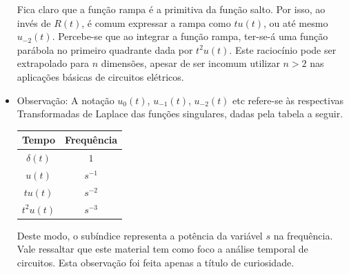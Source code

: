 \documentclass{article}
\numberwithin{equation}{section}
\begin{document}
\begin{itemize}
    Fica claro que a função rampa é a primitiva da função salto. Por isso, ao invés de $R(t)$, é comum expressar a rampa como $tu(t)$, ou até mesmo $u_{-2}(t)$. Percebe-se que ao integrar a função rampa, ter-se-á uma função parábola no primeiro quadrante dada por $t^2u(t)$. Este raciocínio pode ser extrapolado para $n$ dimensões, apesar de ser incomum utilizar $n>2$ nas aplicações básicas de circuitos elétricos.

    \item Observação: A notação $u_0(t)$, $u_{-1}(t)$, $u_{-2}(t)$ etc refere-se às respectivas Transformadas de Laplace das funções singulares, dadas pela tabela a seguir.

    \begin{center}
        \begin{tabular}{c|c}
            Tempo & Frequência \\ \hline
            $\delta(t)$ & $1$ \\
            $u(t)$ & $s^{-1}$ \\
            $tu(t)$ & $s^{-2}$ \\
            $t^2u(t)$ & $s^{-3}$
        \end{tabular}
    \end{center}

    Deste modo, o subíndice representa a potência da variável $s$ na frequência. Vale ressaltar que este material tem como foco a análise temporal de circuitos. Esta observação foi feita apenas a título de curiosidade.
\end{itemize}
\end{document}

